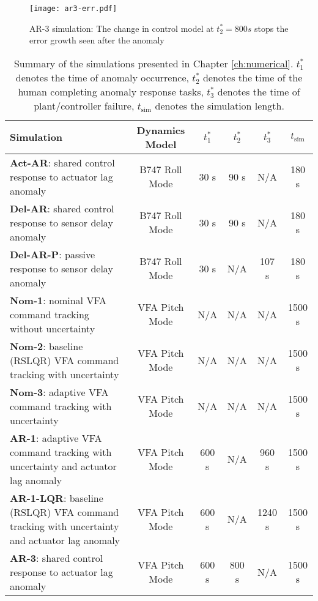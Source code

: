 \begin{figure}[htbp]
	\centering
	\texttt{[image: ar3-err.pdf]}
	\caption{AR-3 simulation: The change in control model at $t_2^* = 800 s$ stops the error growth seen after the anomaly}
	\label{fig:ar3-err}
\end{figure}


\begin{table}[htb]
 \renewcommand{\arraystretch}{1.6}
  \begin{tabular}{>{\raggedright}m{2.2in}|c c c c c}
    \textbf{Simulation} & \textbf{Dynamics Model} & $t_1^*$ & $t_2^*$ & $t_3^*$ & $t_{\textrm{sim}}$ \\
    \hline
    \textbf{Act-AR}: shared control response to actuator lag anomaly & B747 Roll Mode &  30 s & 90 s & N/A & 180 s\\
    \textbf{Del-AR}: shared control response to sensor delay anomaly  & B747 Roll Mode & 30 s & 90 s & N/A & 180 s\\
    \textbf{Del-AR-P}: passive response to sensor delay anomaly  & B747 Roll Mode & 30 s & N/A & 107 s & 180 s\\ \hline
    \textbf{Nom-1}:  nominal VFA command tracking without uncertainty & VFA Pitch Mode & N/A & N/A & N/A & 1500 s\\
    \textbf{Nom-2}: baseline (RSLQR) VFA command tracking with uncertainty & VFA Pitch Mode & N/A & N/A & N/A & 1500 s\\
    \textbf{Nom-3}: adaptive VFA command tracking with uncertainty & VFA Pitch Mode & N/A & N/A & N/A & 1500 s\\ \hline
    \textbf{AR-1}: adaptive VFA command tracking with uncertainty and actuator lag anomaly & VFA Pitch Mode & 600 s & N/A & 960 s & 1500 s\\
    \textbf{AR-1-LQR}: baseline (RSLQR) VFA command tracking with uncertainty and actuator lag anomaly & VFA Pitch Mode & 600 s & N/A & 1240 s & 1500 s\\
    \textbf{AR-3}: shared control response to actuator lag anomaly & VFA Pitch Mode & 600 s & 800 s & N/A & 1500 s\\
  \end{tabular}
  \caption{Summary of the simulations presented in Chapter \ref{ch:numerical}. $t_1^*$ denotes the time of anomaly occurrence, $t_2^*$ denotes the time of the human completing anomaly response tasks, $t_3^*$ denotes the time of plant/controller failure, $t_{\textrm{sim}}$ denotes the simulation length.}
\end{table}

